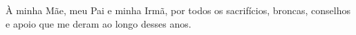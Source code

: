 À minha Mãe, meu Pai e minha Irmã, por todos os sacrifícios, broncas, conselhos e apoio que me deram ao longo desses anos. 



